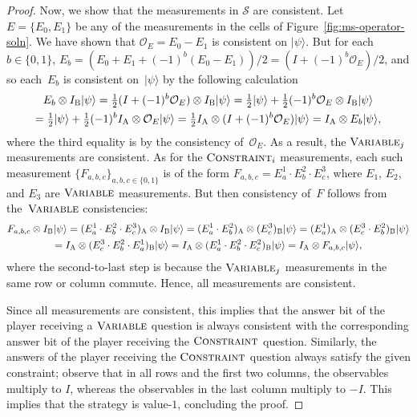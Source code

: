 \documentclass[11pt]{article}
\theoremstyle{definition}
\newcommand{\ket}[1]{|#1\rangle}
\newcommand{\strategy}{\mathscr{S}}
\newcommand{\labelstyle}[1]{\ensuremath{\textsc{#1}}\xspace}
\newcommand{\alice}{\labelstyle{A}}
\newcommand{\bob}{\labelstyle{B}}
\newcommand{\typestyle}[1]{\ensuremath{\textsc{#1}}\xspace}
\newcommand{\Constraint}{\typestyle{Constraint}}
\newcommand{\Variable}{\typestyle{Variable}}
\renewcommand{\cal}[1]{\mathcal{#1}}
\begin{document}
\begin{proof}
  Now, we show that the measurements in $\strategy$ are consistent.
  Let $E = \{E_0, E_1\}$ be any of the measurements in the cells of Figure~\ref{fig:ms-operator-soln}.
  We have shown that $\cal{O}_E = E_0- E_1$ is consistent on $\ket{\psi}$.
  But for each $b \in \{0, 1\}$, $E_b = (E_0 + E_1 + (-1)^b (E_0 - E_1))/2 = (I + (-1)^b \cal{O}_E)/2$, and so each~$E_b$ is consistent on~$\ket{\psi}$ by the following calculation
  \begin{multline*}
  E_b \otimes I_\bob \ket{\psi}
  = \tfrac{1}{2} (I + (-1)^b \cal{O}_E) \otimes I_\bob \ket{\psi}
  = \tfrac{1}{2} \ket{\psi} + \tfrac{1}{2} (-1)^b \cal{O}_E \otimes I_\bob \ket{\psi}\\
  = \tfrac{1}{2} \ket{\psi} + \tfrac{1}{2} (-1)^b I_\alice \otimes \cal{O}_E \ket{\psi}
  = \tfrac{1}{2} I_\alice \otimes (I + (-1)^b \cal{O}_E) \ket{\psi}
  = I_\alice \otimes E_b \ket{\psi},
  \end{multline*}
  where the third equality is by the consistency of~$\cal{O}_E$.
  As a result, the $\Variable_j$ measurements are consistent.
  As for the $\Constraint_i$ measurements,
  each such measurement $\{F_{a, b, c}\}_{a, b, c \in \{0, 1\}}$ is of the form $F_{a, b, c} = E^1_a \cdot E^2_b \cdot E^3_c$,
  where $E_1$, $E_2$, and $E_3$ are $\Variable$ measurements.
  But then consistency of~$F$ follows from the~$\Variable$ consistencies:
  \begin{multline*}
  F_{a, b, c} \otimes I_{\bob} \ket{\psi}
  = (E^1_a \cdot E^2_b \cdot E^3_c)_{\alice} \otimes I_{\bob} \ket{\psi}
  = (E^1_a \cdot E^2_b)_{\alice} \otimes (E^3_c)_{\bob} \ket{\psi}
    = (E^1_a)_{\alice} \otimes (E^3_c \cdot E^2_b)_{\bob} \ket{\psi}\\
        = I_{\alice} \otimes (E^3_c \cdot E^2_b \cdot E^1_a)_{\bob} \ket{\psi}
        = I_{\alice} \otimes (E^1_a \cdot E^2_b \cdot E^2_c)_{\bob} \ket{\psi}
                = I_{\alice} \otimes F_{a, b,c} \ket{\psi},
  \end{multline*}
  where the second-to-last step is because the $\Variable_j$ measurements in the same row or column commute.
  Hence, all measurements are consistent.
  
  Since all measurements are consistent, this
  implies that the answer bit of the player receiving a $\Variable$ question is
  always consistent with the corresponding answer bit of the player receiving
  the $\Constraint$ question.
  Similarly, the answers of the player receiving the $\Constraint$ question
  always satisfy the given constraint; observe that in all rows and the first
  two columns, the observables multiply to $I$, whereas the observables in the
  last column multiply to $-I$.
  This implies that the strategy is value-$1$, concluding the proof.
\end{proof}
\end{document}
